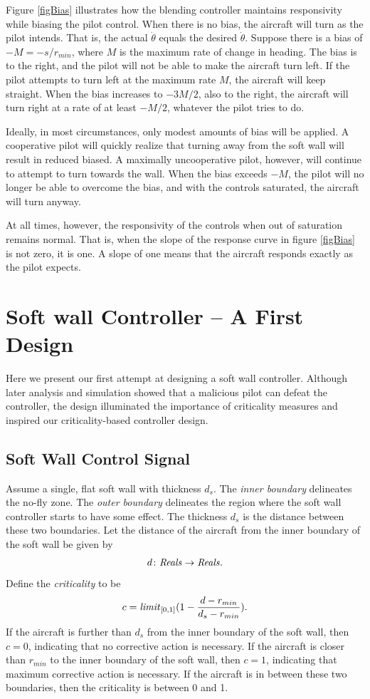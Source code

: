 \documentclass[11pt]{article}
\begin{document}
Figure \ref{figBias}
illustrates how the blending controller maintains responsivity while
biasing the pilot control.
When there is no bias, the aircraft will turn as the
pilot intends. That is, the actual $\dot{\theta}$ equals the desired
$\dot{\theta}$.
Suppose there is a bias of $-M = -s/r_{min}$, where $M$ is the maximum rate of
change in heading.
The bias is to the right, and the pilot will not be able to make the
aircraft turn left.
If the pilot attempts to turn left at the maximum rate $M$,
the aircraft will keep straight.
When the bias increases to $-3M/2$, also to the right,
the aircraft will turn right at
a rate of at least $-M/2$, whatever the pilot tries to do.

Ideally, in most circumstances, only modest amounts of bias will be applied.
A cooperative pilot will quickly realize that turning away from the soft
wall will result in reduced biased.  A maximally uncooperative pilot, however,
will continue to attempt to turn towards the wall.
When the bias exceeds $-M$, the pilot will no longer be able to
overcome the bias, and with the controls saturated, the aircraft will turn
anyway.

At all times, however, the responsivity of the controls when out of saturation
remains normal. That is, when the slope of the response curve in figure
\ref{figBias} is not zero, it is one.  A slope of one means that the
aircraft responds exactly as the pilot expects.

\section{Soft wall Controller -- A First Design}

Here we present our first attempt at designing a soft wall controller.
Although later analysis and simulation showed that a malicious pilot can defeat
the controller, the design illuminated the importance of criticality measures
and inspired our criticality-based controller design.

\subsection{Soft Wall Control Signal}

Assume a single, flat soft wall with thickness $d_s$.
The \textit{inner boundary} delineates the no-fly zone.
The \textit{outer boundary} delineates the region where the
soft wall controller starts to have some effect.
The thickness $d_s$ is the distance between these two boundaries.
Let the distance of the aircraft from the inner boundary of
the soft wall be given by
\[
d \colon \mbox{\textit{Reals}} \to \mbox{\textit{Reals}} .
\]
Define the \textit{criticality} to be
\[
c = \mbox{\textit{limit}}_{[0,1]}(1 - {{d - r_{min}}\over{d_s - r_{min}}}) .
\]
If the aircraft is further than $d_s$ from the inner boundary of the
soft wall, then $c = 0$, indicating that no corrective action is necessary.
If the aircraft is closer than $r_{min}$ to the inner boundary of the soft wall,
then $c = 1$, indicating that maximum corrective action is necessary.
If the aircraft is in between these two boundaries, then the criticality
is between 0 and 1.
\end{document}
